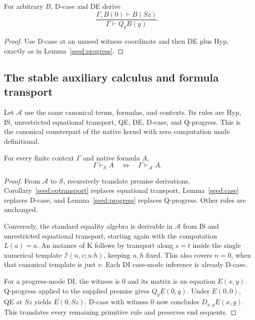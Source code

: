 \begin{lemma}\label{seed:Qcase}
For arbitrary $B$, D-case and DE derive
\[
 \frac{\Gamma,B(0)\vdash B(Sz)}{\Gamma\vdash Q_yB(y)}.
 \tag{Q-case}\label{seed:qcase}
\]
\end{lemma}
\begin{proof}
Use D-case at an unused witness coordinate and then DE plus Hyp,
exactly as in Lemma~\ref{seed:progress}.
\end{proof}

\subsection{The stable auxiliary calculus and formula transport}

Let $\mathcal A$ use the same canonical terms, formulas, and contexts.
Its rules are Hyp, IS, unrestricted equational transport,
QE, DE, D-case, and Q-progress. This is the canonical counterpart of
the native kernel with zero computation made definitional.

\begin{theorem}\label{seed:auxequiv}
For every finite context $\Gamma$ and native formula $A$,
\[
 \Gamma\vdash_{\mathcal S}A
 \quad\Longleftrightarrow\quad
 \Gamma\vdash_{\mathcal A}A.
\]
\end{theorem}
\begin{proof}
From $\mathcal A$ to $\mathcal S$, recursively translate premise
derivations. Corollary~\ref{seed:eqtransport} replaces equational
transport, Lemma~\ref{seed:case} replaces D-case, and
Lemma~\ref{seed:progress} replaces Q-progress. Other rules are unchanged.

Conversely, the standard equality algebra is derivable in
$\mathcal A$ from IS and unrestricted equational transport, starting
again with the computation $L(a)=a$. An instance of K follows by
transport along $s=t$ inside the single numerical template
$\mathcal I(n,v;u.h)$, keeping $n,h$ fixed.
This also covers $n=0$, when that canonical template is just $v$.
Each DI case-mode inference is already D-case.

For a progress-mode DI, the witness is $0$ and its matrix is an equation
$E(x,y)$. Q-progress applied to the supplied premise gives
$Q_yE(0,y)$. Under $E(0,0)$, QE at $Sz$ yields $E(0,Sz)$.
D-case with witness $0$ now concludes $D_{x,y}E(x,y)$.
This translates every remaining primitive rule and preserves end sequents.
\end{proof}

